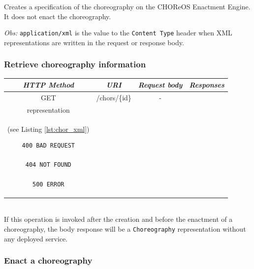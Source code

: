 \documentclass[a4paper, 10pt]{article}
\newcommand{\ee}{CHOReOS Enactment Engine}
\begin{document}
Creates a specification of the choreography on the \ee.
It does not enact the choreography. 

\emph{Obs:} \texttt{application/xml} is the value to the \texttt{Content Type} header when XML representations are written in the request or response body. 

\subsubsection*{Retrieve choreography information}

\begin{tabular}{|c|c|c|c|}
\hline 
\itshape{HTTP Method} & \itshape{URI} & \itshape{Request body} & \itshape{Responses} \\ 
\hline 
GET & /chors/\{id\} & - &
\begin{minipage}{2in}
\begin{verbatim}

200 OK
location = "/chors/{id}"

Body: 
\end{verbatim}
\verb!Choreography! XML \\
representation \\
(see Listing \ref{lst:chor_xml})
\begin{verbatim}
400 BAD REQUEST

404 NOT FOUND

500 ERROR

\end{verbatim}
\end{minipage} 
\\ 
\hline 
\end{tabular} \\

If this operation is invoked after the creation and before the enactment of a choreography, the body response will be a \verb!Choreography! representation without any deployed service.

\subsubsection*{Enact a choreography}
\end{document}
